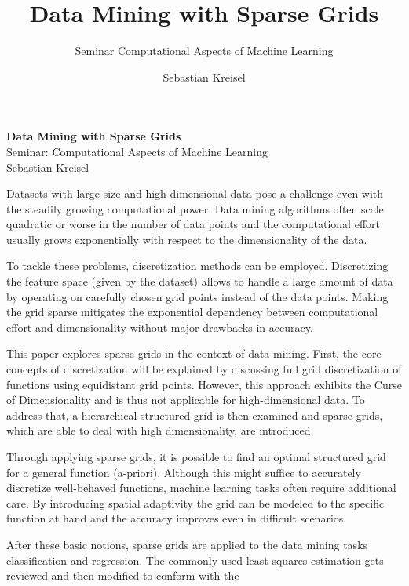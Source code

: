 \documentclass[a4paper]{scrartcl}
\title{Data Mining with Sparse Grids}
\subtitle{Seminar Computational Aspects of Machine Learning}
\author{Sebastian Kreisel}
\date{}
\begin{document}
\thispagestyle{empty}
\begin{center}
  \huge{\textbf{Data Mining with Sparse Grids}} \\
  \vspace{6px}
  \large{Seminar: Computational Aspects of Machine Learning} \\
  \vspace{10px}
  Sebastian Kreisel
\end{center}
\vspace{20px}
Datasets with large size and high-dimensional data pose a challenge even
with the steadily growing computational power.
Data mining algorithms often scale quadratic or worse in the number of
data points and the computational effort usually grows exponentially with
respect to the
dimensionality of the data.
\par
To tackle these problems, discretization methods can be employed.
Discretizing the feature space (given by the dataset)
allows to handle a large amount of data
by operating on carefully chosen grid points instead of the data points.
Making the grid sparse mitigates the exponential
dependency between computational effort and dimensionality without
major drawbacks in accuracy.
\par
This paper explores sparse grids in the context of data mining.
First, the core concepts of discretization will be explained by
discussing full grid discretization of functions
using equidistant grid points. However,
this approach exhibits the Curse of Dimensionality and is thus not
applicable for high-dimensional data. To address that, a hierarchical
structured grid is then examined and
sparse grids, which are able to deal with high
dimensionality, are introduced.
\par
Through applying sparse grids,
it is possible to find an optimal structured
grid for a general function (a-priori). Although this might suffice to
accurately discretize well-behaved functions, machine learning
tasks often require additional care. By introducing spatial adaptivity
the grid can be modeled to the specific function at hand and the accuracy
improves even in difficult scenarios.
\par
After these basic notions, sparse grids are
applied to the data mining tasks classification and regression.
The commonly used least squares
estimation gets reviewed and then modified to conform with the
\end{document}
